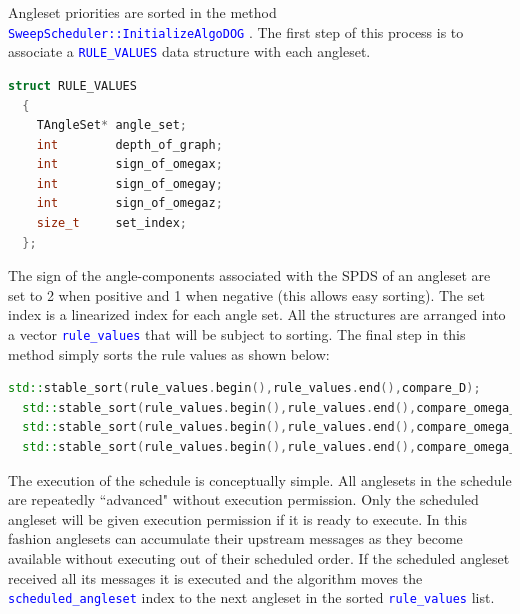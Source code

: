 \documentclass[11pt,letterpaper,titlepage]{article}
\newcommand{\xmltag}[1]{\textcolor{blue}{ \texttt{#1}} }
\numberwithin{equation}{section}
\begin{document}
Angleset priorities are sorted in the method \xmltag{SweepScheduler::InitializeAlgoDOG}. The first step of this process is to associate a \xmltag{RULE\_VALUES} data structure with each angleset.

\begin{lstlisting}[language=c++]
struct RULE_VALUES
  {
    TAngleSet* angle_set;
    int        depth_of_graph;
    int        sign_of_omegax;
    int        sign_of_omegay;
    int        sign_of_omegaz;
    size_t     set_index;
  };
\end{lstlisting}

The sign of the angle-components associated with the SPDS of an angleset are set to 2 when positive and 1 when negative (this allows easy sorting). The set index is a linearized index for each angle set. All the structures are arranged into a vector \xmltag{rule\_values} that will be subject to sorting. The final step in this method simply sorts the rule values as shown below:

\begin{lstlisting}[language=c++]
  std::stable_sort(rule_values.begin(),rule_values.end(),compare_D);
  std::stable_sort(rule_values.begin(),rule_values.end(),compare_omega_x);
  std::stable_sort(rule_values.begin(),rule_values.end(),compare_omega_y);
  std::stable_sort(rule_values.begin(),rule_values.end(),compare_omega_z);
\end{lstlisting}

The execution of the schedule is conceptually simple. All anglesets in the schedule are repeatedly ``advanced" without execution permission. Only the scheduled angleset will be given execution permission if it is ready to execute. In this fashion anglesets can accumulate their upstream messages as they become available without executing out of their scheduled order. If the scheduled angleset received all its messages it is executed and the algorithm moves the \xmltag{scheduled\_angleset} index to the next angleset in the sorted \xmltag{rule\_values} list.  
\end{document}

